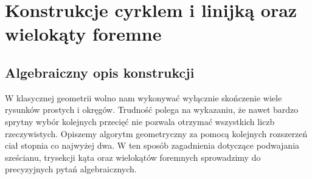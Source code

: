 \chapter[Konstrukcje i wielokąty foremne]{Konstrukcje cyrklem i linijką oraz wielokąty foremne}
\label{aa:ch:constructibility}
\section{Algebraiczny opis konstrukcji}

W klasycznej geometrii wolno nam wykonywać wyłącznie skończenie
wiele rysunków prostych i okręgów. Trudność polega na wykazaniu,
że nawet bardzo sprytny wybór kolejnych przecięć nie pozwala
otrzymać wszystkich liczb rzeczywistych. Opiszemy algorytm
geometryczny za pomocą kolejnych rozszerzeń ciał stopnia
co najwyżej dwa. W ten sposób zagadnienia dotyczące
podwajania sześcianu, trysekcji kąta oraz wielokątów
foremnych sprowadzimy do precyzyjnych pytań algebraicznych.

